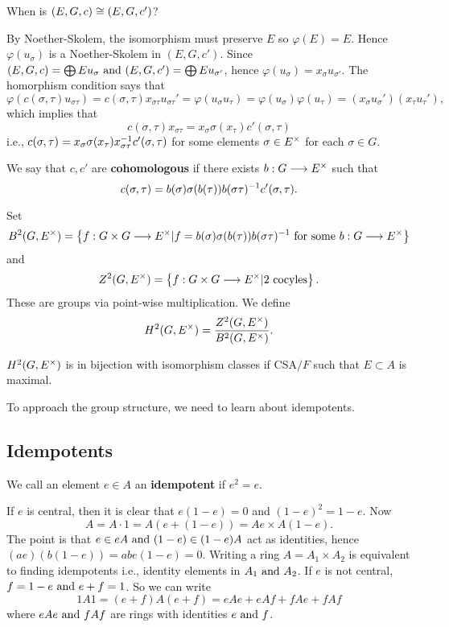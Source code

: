 \begin{question}
When is $(E,G,c) \cong (E,G,c')$?
\end{question}
By Noether-Skolem, the isomorphism must preserve $E$ so $\varphi (E) = E$. Hence $\varphi (u_{\sigma})$ is a Noether-Skolem in $(E,G,c')$. Since $(E,G,c) = \bigoplus Eu_{\sigma} \text{ and } (E,G,c') = \bigoplus Eu_{\sigma '}$, hence $\varphi (u_{\sigma}) = x_{\sigma}u_{\sigma '}.$ The homorphism condition says that 
$$\varphi (c(\sigma , \tau)u_{\sigma\tau}) = c(\sigma,\tau)x_{\sigma\tau}u_{\sigma\tau}'  = \varphi(u_{\sigma}u_{\tau}) = \varphi (u_{\sigma})\varphi(u_{\tau}) = (x_{\sigma}u_{\sigma}')(x_{\tau}u_{\tau}'),$$
which implies that $$c(\sigma , \tau)x_{\sigma \tau} = x_{\sigma} \sigma (x_{\tau})c'(\sigma , \tau)$$
i.e., $c(\sigma , \tau) = x_{\sigma}\sigma (x_{\tau})x_{\sigma\tau}^{-1} c'(\sigma ,\tau)$ for some elements $\sigma \in E^{\times}$ for each $\sigma \in G$.

\begin{defn}\label{4.7}
We say that $c,c'$ are \textbf{cohomologous} if there exists $b : G \longrightarrow E^{\times}$ such that 
$$c(\sigma , \tau) = b(\sigma)\sigma(b(\tau))b(\sigma \tau)^{-1} c'(\sigma ,\tau).$$

\end{defn}

\begin{defn}\label{4.8}
Set $$B^2(G,E^{\times}) = \left\lbrace f : G\times G \longrightarrow E^{\times} | f  = b(\sigma)\sigma (b(\tau))b(\sigma \tau)^{-1} \text{ for some } b : G \longrightarrow E^{\times} \right\rbrace$$ and $$Z^2 (G , E^{\times}) = \left\lbrace f : G\times G \longrightarrow E^{\times} | 2 \text{ cocyles} \right\rbrace.$$ These are groups via point-wise multiplication. We define 
$$H^2(G,E^{\times}) = \frac{Z^2(G,E^{\times})}{B^2(G,E^{\times})}.$$
\end{defn}
\begin{prop}\label{4.9}
$H^2(G,E^{\times})$ is in bijection with isomorphism classes if CSA$/F$ such that $E \subset A$ is maximal.
\end{prop}
To approach the group structure, we need to learn about idempotents.
\subsection{Idempotents}


\begin{defn}\label{4.11}
We call an element $e \in A$ an \textbf{idempotent} if $e^2  = e$. 
\end{defn}
If $e$ is central, then it is clear that $e(1-e) = 0$ and $(1-e)^2 = 1 -e$. Now $$A = A \cdot 1 = A(e + (1-e)) = Ae \times A(1-e).$$
The point is that $e \in eA \text{ and } (1-e) \in (1-e)A$ act as identities, hence $(ae)(b(1-e)) = abe(1-e) = 0$. Writing a ring $A = A_1 \times A_2$ is equivalent to finding idempotents i.e., identity elements in $A_1 \text{ and } A_2$. If $e$ is not central, $f=  1 -e \text{ and } e + f = 1$. So we can write
$$1 A 1 = (e+f)A(e+f) = eAe + eAf + fAe + fAf$$ 
where $eAe \text{ and } fAf$ are rings with identities $e\text{ and } f$. 

